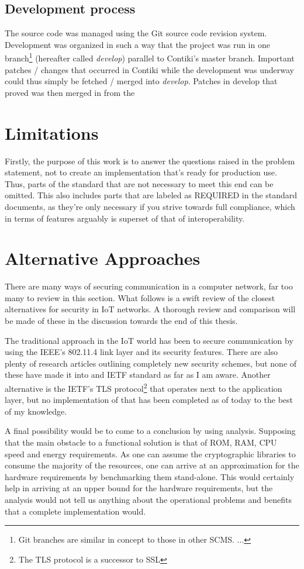 \documentclass[final,a4paper,twoside,11pt,onecolumn]{report}
\begin{document}
\subsection{Development process}
The source code was managed using the Git source code revision system. Development was organized in such a way that the project was run in one branch\footnote{Git branches are similar in concept to those in other SCMS. ...} (hereafter called \emph{develop}) parallel to Contiki's master branch. Important patches / changes that occurred in Contiki while the development was underway could thus simply be fetched / merged into \emph{develop}. Patches in develop that proved  was then merged in from the 

\section{Limitations}
Firstly, the purpose of this work is to answer the questions raised in the problem statement, not to create an implementation that's ready for production use. Thus, parts of the standard that are not necessary to meet this end can be omitted. This also includes parts that are labeled as REQUIRED in the standard documents, as they're only necessary if you strive towards full compliance, which in terms of features arguably is superset of that of interoperability.

\section{Alternative Approaches}
There are many ways of securing communication in a computer network, far too many to review in this section. What follows is a swift review of the closest alternatives for security in IoT networks. A thorough review and comparison will be made of these in the discussion towards the end of this thesis.

The traditional approach in the IoT world has been to secure communication by using the IEEE's 802.11.4 link layer and its security features. There are also plenty of research articles outlining completely new security schemes, but none of these have made it into and IETF standard as far as I am aware. Another alternative is the IETF's TLS protocol\footnote{The TLS protocol is a successor to SSL} that operates next to the application layer, but no implementation of that has been completed as of today to the best of my knowledge.

A final possibility would be to come to a conclusion by using analysis. Supposing that the main obstacle to a functional solution is that of ROM, RAM, CPU speed and energy requirements. As one can assume the cryptographic libraries to consume the majority of the resources, one can arrive at an approximation for the hardware requirements by benchmarking them stand-alone. This would certainly help in arriving at an upper bound for the hardware requirements, but the analysis would not tell us anything about the operational problems and benefits that a complete implementation would.
\end{document}
